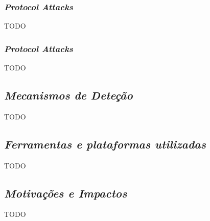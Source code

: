 \subsubsection{\textit{Protocol Attacks}}
TODO


\subsubsection{\textit{Protocol Attacks}}
TODO


\subsection{\textit{Mecanismos de Deteção}}
TODO


\subsection{\textit{Ferramentas e plataformas utilizadas}}
TODO


\subsection{\textit{Motivações e Impactos}}
TODO
